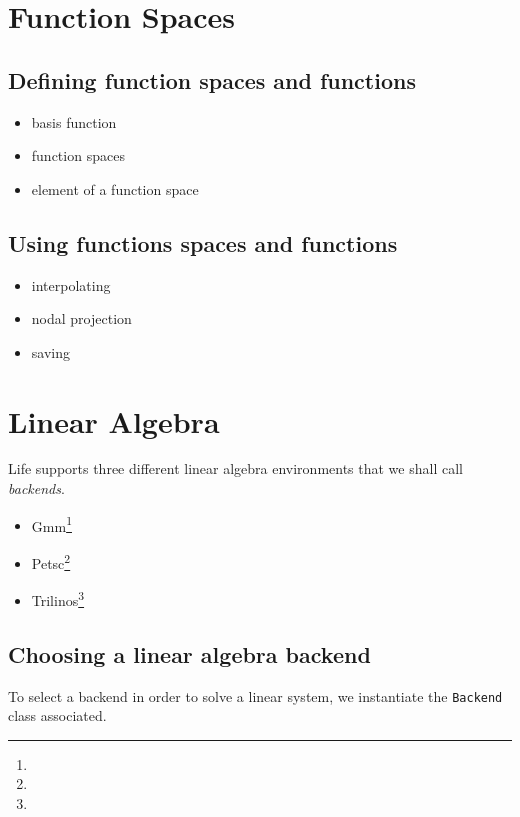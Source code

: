\documentclass[a4paper]{book}
\begin{document}
\section{Function Spaces}
\label{sec:function-spaces}

\subsection{Defining function spaces and functions}

\begin{itemize}
\item basis function
\item function spaces
\item element of a function space
\end{itemize}

\subsection{Using functions spaces and functions}

\begin{itemize}
\item interpolating
\item nodal projection
\item saving
\end{itemize}


\section{Linear Algebra}
\label{sec:linear-algebra}


Life supports three different linear algebra environments that we
shall call \emph{backends}.
\begin{itemize}
\item Gmm\footnote{}
\item Petsc\footnote{}
\item Trilinos\footnote{}
\end{itemize}


\subsection{Choosing a linear algebra backend}
\label{sec:choos-line-algebra}

To select a backend in order to solve a linear system, we instantiate
the \lstinline!Backend! class associated.
\end{document}
